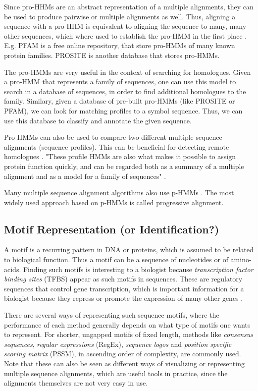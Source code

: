 \documentclass{article}
\begin{document}
Since pro-HHMs are an abstract representation of a multiple alignments, they can be used to produce pairwise or multiple alignments as well. Thus, aligning a sequence with a pro-HHM is equivalent to aligning the sequence to many, many other sequences, which where used to establish the pro-HMM in the first place \cite{Christianini2006}. E.g. PFAM is a free online repository, that store pro-HMMs of many known protein families. PROSITE is another database that stores pro-HMMs. 

The pro-HMMs are very useful in the context of searching for homologues. Given a pro-HMM that represents a family of sequences, one can use this model to search in a database of sequences, in order to find additional homologues to the family. Similary, given a database of pre-built pro-HMMs (like PROSITE or PFAM), we can look for matching profiles to a symbol sequence. Thus, we can use this database to classify and annotate the given sequence. 

Pro-HMMs can also be used to compare two different multiple sequence alignments (sequence profiles). This can be beneficial for detecting remote homologues \cite{Yoon2009}. "These proﬁle HMMs are also what makes it possible to assign protein function quickly, and can be regarded both as a summary of a multiple alignment and as a model for a family of sequences" \cite{Christianini2006}.

Many multiple sequence alignment algorithms also use p-HMMs \cite{Yoon2009}. The most widely used approach based on p-HMMs is called progressive alignment. 

\subsection{Motif Representation (or Identification?)}\label{Section:Motivs}
A motif is a recurring pattern in DNA or proteins, which is assumed to be related to biological function. Thus a motif can be a sequence of nucleotides or of amino-acids. Finding such motifs is interesting to a biologist because \textit{transcription factor binding sites} (TFBS) appear as such motifs in sequences. These are regulatory sequences that control gene transcription, which is important information for a biologist because they repress or promote the expression of many other genes \cite{Christianini2006}.

There are several ways of representing such sequence motifs, where the performance of each method generally depends on what type of motifs one wants to represent. For shorter, ungapped motifs of fixed length, methods like \textit{consensus sequences}, \textit{regular expressions} (RegEx), \textit{sequence logos} and \textit{position specific scoring matrix} (PSSM), in ascending order of complexity, are commonly used. Note that these can also be seen as different ways of visualizing or representing multiple sequence alignments, which are useful tools in practice, since the alignments themselves are not very easy in use. 
\end{document}
